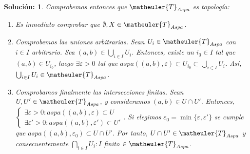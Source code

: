 \documentclass[10pt,a4paper,openright]{book}
\theoremstyle{break}
\newtheorem*{sol}{\underline{Solución}:}
\begin{document}
\begin{sol}
Comprobemos entonces que $\matheuler{T}_{Aspa}$ es topología:
\begin{enumerate}[label={(\arabic*)}]
\item Es inmediato comprobar que $\emptyset, X \in \matheuler{T}_{Aspa}$.
\item Comprobemos las uniones arbitrarias. Sean $U_i \in \matheuler{T}_{Aspa}$ con $i \in I$ arbitrario. Sea $(a,b) \in \bigcup_{i \in I} U_i$. Entonces, existe un $i_0 \in I$ tal que $(a,b) \in U_{i_0}$, luego $\exists \varepsilon > 0$ tal que $aspa((a,b), \varepsilon) \subset U_{i_0} \subset \bigcup_{i \in I} U_i$. Así, $\bigcup_{i \in I} U_i \in \matheuler{T}_{Aspa}$.
\item Comprobamos finalmente las intersecciones finitas. Sean $U, U' \in \matheuler{T}_{Aspa}$, y consideramos $(a,b) \in U \cap U'$. Entonces, $\begin{cases} \exists \varepsilon > 0 : aspa((a,b), \varepsilon) \subset U \\ \exists \varepsilon' > 0 : aspa((a,b), \varepsilon') \subset U' \end{cases}$. Si elegimos $\varepsilon_0 = \min \{\varepsilon, \varepsilon'\}$ se cumple que $aspa((a,b), \varepsilon_0) \subset U \cap U'$. Por tanto, $U \cap U' \in \matheuler{T}_{Aspa}$ y consecuentemente $\bigcap_{i \in I} U_i : I$ finito $\in \matheuler{T}_{Aspa}$.
\end{enumerate}
\end{sol}
\end{document}
